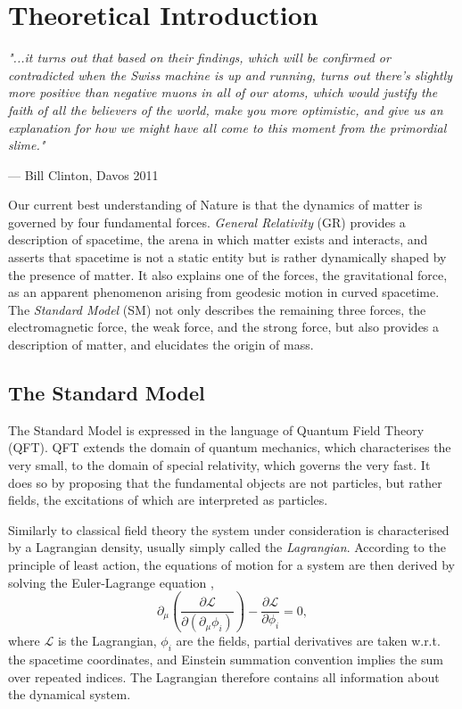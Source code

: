 \chapter{Theoretical Introduction}

\textit{"...it turns out that based on their findings, which will be confirmed
or contradicted when the Swiss machine is up and running, turns out there's
slightly more positive than negative muons in all of our atoms, which would
justify the faith of all the believers of the world, make you more
optimistic, and give us an explanation for how we might have all come to this
moment from the primordial slime."}
\vspace{5mm}
\begin{flushright}
--- Bill Clinton, Davos 2011
\end{flushright}

\newpage
\noindent
Our current best understanding of Nature is that the dynamics of matter is governed
by four fundamental forces. \textit{General Relativity} (GR) provides a
description of spacetime, the arena in which matter exists and interacts, and asserts
that spacetime is not a static entity but is rather dynamically shaped by the presence
of matter. It also explains one of the forces, the gravitational force, as an apparent
phenomenon arising from geodesic motion in curved spacetime. The \textit{Standard Model}
(SM) not only describes the remaining three forces, the electromagnetic force,
the weak force, and the strong force, but also provides a description of matter, and 
elucidates the origin of mass.

\section{The Standard Model}

The Standard Model is expressed in the language of Quantum Field Theory (QFT). QFT 
extends the domain of quantum mechanics, which characterises the very small, to
the domain of special relativity, which governs the very fast. It does so by
proposing that the fundamental objects are not particles, but rather fields, the
excitations of which are interpreted as particles.

Similarly to classical field theory the system under consideration is characterised
by a Lagrangian density, usually simply called the \textit{Lagrangian}. According to
the principle of least action, the equations of motion for a system are then derived
by solving the Euler-Lagrange equation \cite{Thomson:2013zua},
\begin{equation}
\partial_\mu \left(\frac{\partial \mathcal{L}}{\partial(\partial_\mu \phi_i)}\right)
- \frac{\partial{\mathcal{L}}}{\partial \phi_i} = 0,
\end{equation}
where $\mathcal{L}$ is the Lagrangian, $\phi_i$ are the fields, partial derivatives
are taken w.r.t. the spacetime coordinates, and Einstein summation convention implies
the sum over repeated indices. The Lagrangian therefore contains all
information about the dynamical system. 

